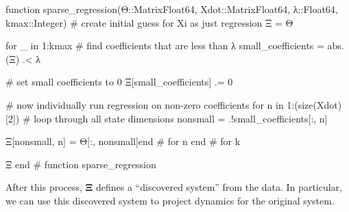 \documentclass[10pt]{paper}
\begin{document}
\begin{jllisting}[language = Julia, caption = {Sparse regression}, label = {lst:sparse_regression}, float, floatplacement = ptb]
function sparse_regression(Θ::Matrix{Float64}, Xdot::Matrix{Float64}, λ::Float64, kmax::Integer) 
    # create initial guess for Xi as just regression
    Ξ = Θ\Xdot

    for _ in 1:kmax 
        # find coefficients that are less than λ 
        small_coefficients = abs.(Ξ) .< λ

        # set small coefficients to 0 
        Ξ[small_coefficients] .= 0

        # now individually run regression on non-zero coefficients
        for n in 1:(size(Xdot)[2]) # loop through all state dimensions 
            nonsmall = .!small_coefficients[:, n]
            
            Ξ[nonsmall, n] = Θ[:, nonsmall]\Xdot[:, n]
        end # for n
    end # for k 

    Ξ
end # function sparse_regression
\end{jllisting}
After this process, $\mathbf \Xi$ defines a ``discovered system'' from the data. In particular, we can use this discovered system to project dynamics for the original system. 

\end{document}

